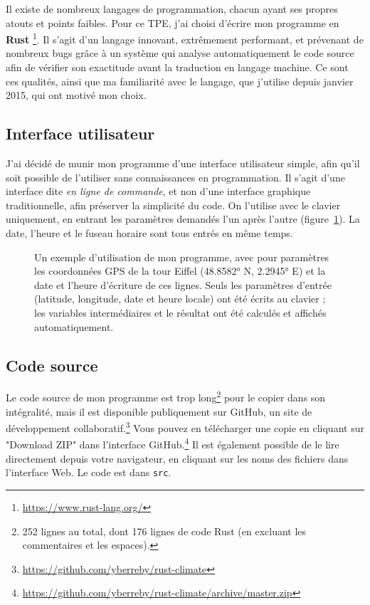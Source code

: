 \documentclass[12pt]{article}
\begin{document}
Il existe de nombreux langages de programmation, chacun ayant ses propres atouts et points faibles.
Pour ce TPE, j'ai choisi d'écrire mon programme en \textbf{Rust} \footnote{\url{https://www.rust-lang.org/}}.
Il s'agit d'un langage innovant, extrêmement performant, et prévenant de nombreux bugs grâce à un système qui analyse automatiquement le code source afin de vérifier son exactitude avant la traduction en langage machine.
Ce sont ces qualités, ainsi que ma familiarité avec le langage, que j'utilise depuis janvier 2015, qui ont motivé mon choix.


\subsection{Interface utilisateur}

J'ai décidé de munir mon programme d'une interface utilisateur simple, afin qu'il soit possible de l'utiliser sans connaissances en programmation. Il s'agit d'une interface dite \emph{en ligne de commande}, et non d'une interface graphique traditionnelle, afin préserver la simplicité du code. On l'utilise avec le clavier uniquement, en entrant les paramètres demandés l'un après l'autre (figure~\ref{fig:demo}). La date, l'heure et le fuseau horaire sont tous entrés en même temps.

\begin{figure}[!htbp]
  \centering
  \caption{Un exemple d'utilisation de mon programme, avec pour paramètres les coordonnées GPS de la tour Eiffel (48.8582° N, 2.2945° E) et la date et l'heure d'écriture de ces lignes. Seuls les paramètres d'entrée (latitude, longitude, date et heure locale) ont été écrits au clavier ; les variables intermédiaires et le résultat ont été calculés et affichés automatiquement.}
  \label{fig:demo}
\end{figure}


\FloatBarrier
\subsection{Code source}

Le code source de mon programme est trop long\footnote{252 lignes au total, dont 176 lignes de code Rust (en excluant les commentaires et les espaces).} pour le copier dans son intégralité, mais il est disponible publiquement sur GitHub, un site de développement collaboratif.\footnote{\url{https://github.com/yberreby/rust-climate}}
Vous pouvez en télécharger une copie en cliquant sur "Download ZIP" dans l'interface GitHub.\footnote{\url{https://github.com/yberreby/rust-climate/archive/master.zip}}
Il est également possible de le lire directement depuis votre navigateur, en cliquant sur les noms des fichiers dans l'interface Web.
Le code est dans \texttt{src}.
\end{document}
